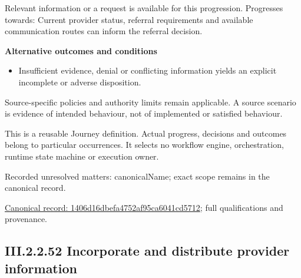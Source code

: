 Relevant information or a request is available for this progression. Progresses towards: Current provider status, referral requirements and available communication routes can inform the referral decision.



\par\medskip\textbf{Alternative outcomes and conditions}\par


\begin{itemize}


\item Insufficient evidence, denial or conflicting information yields an explicit incomplete or adverse disposition.

\end{itemize}


Source-specific policies and authority limits remain applicable. A source scenario is evidence of intended behaviour, not of implemented or satisfied behaviour.



This is a reusable Journey definition. Actual progress, decisions and outcomes belong to particular occurrences. It selects no workflow engine, orchestration, runtime state machine or execution owner.


{\small Recorded unresolved matters: canonicalName; exact scope remains in the canonical record.}\par
{\footnotesize \href{../../../../../../../continuum/strategy/value-stream/1406d16dbefa4752af95ca6041cd5712.md}{Canonical record: 1406d16dbefa4752af95ca6041cd5712}; full qualifications and provenance.}\par
\subsection*{III.2.2.52 Incorporate and distribute provider information}
\label{navigation:III.2.2.52}

